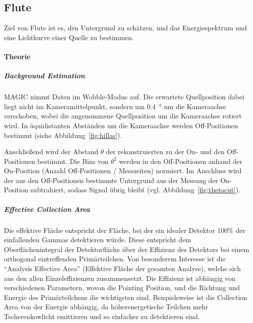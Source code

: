 \subsection{Flute}%
\label{sub:flute}

Ziel von Flute ist es,
den Untergrund zu schätzen,
und das Energiespektrum und
eine Lichtkurve einer Quelle zu bestimmen.

\paragraph{Theorie}%

\subparagraph{Background Estimation}
MAGIC nimmt Daten im Wobble-Modus auf.
Die erwartete Quellposition dabei liegt nicht im
Kameramittelpunkt,
sondern um
\SI{0.4}{\degree} um die Kameraachse
verschoben,
wobei die angenommene Quellposition um die Kameraachse rotiert wird.
In äquidistanten Abständen um die Kameraachse 
werden Off-Positionen bestimmt (siehe Abbildung~\ref{fig:hillas}).

Anschließend wird der Abstand $\theta$ der rekonstruierten
zu der On- und den Off-Positionen bestimmt.
Die Bins von $\theta^2$ werden in den Off-Positionen
anhand der On-Position (Anzahl Off-Positionen / Messzeiten) normiert.
Im Anschluss wird der aus den Off-Positionen bestimmte Untergrund
aus der Messung der On-Position subtrahiert, sodass Signal übrig bleibt
(vgl. Abbildung~\ref{fig:thetacut}).


\subparagraph{Effective Collection Area}
Die effektive Fläche entspricht der Fläche,
bei der ein idealer Detektor 100\%
der einfallenden Gammas detektieren würde.
Diese entspricht dem Oberflächenintegral der Detektorfläche
über der Effizienz des Detektors
bei einem orthogonal eintreffenden Primärteilchen.
Von besonderem Interesse ist die \enquote{Analysis Effective Area}
(Effektive Fläche der gesamten Analyse),
welche sich aus den allen Einzeleffizienzen zusammensetzt.
Die Effizienz ist abhängig von verschiedenen Parametern,
wovon die Pointing Position,
und die Richtung und Energie des Primärteilchens
die wichtigsten sind.
Beispielsweise ist die Collection Area von der Energie abhängig,
da höherenergetische Teilchen mehr Tscherenkowlicht emittieren
und so einfacher zu detektieren sind.


